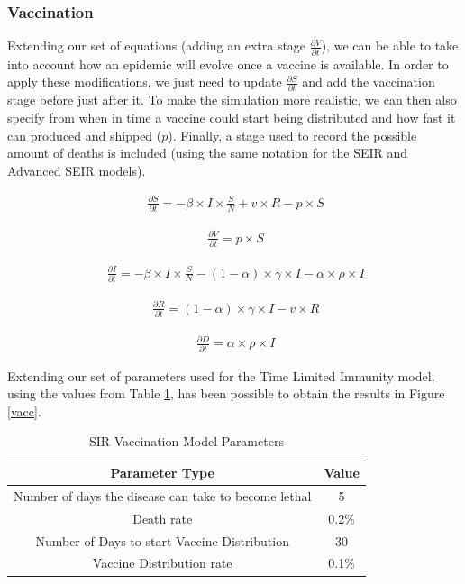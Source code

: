 \subsubsection{Vaccination}

Extending our set of equations (adding an extra stage $\frac{\partial V}{\partial t}$), we can be able to take into account how an epidemic will evolve once a vaccine is available. In order to apply these modifications, we just need to update $\frac{\partial S}{\partial t}$ and add the vaccination stage before just after it. To make the simulation more realistic, we can then also specify from when in time a vaccine could start being distributed and how fast it can produced and shipped ($p$). Finally, a stage used to record the possible amount of deaths is included (using the same notation for the SEIR and Advanced SEIR models).

\useshortskip
\begin{align}
\ \frac{\partial S}{\partial t} = -\beta \times I \times \frac{S}{N} + v \times R - p \times S
\end{align}
\useshortskip

\useshortskip
\begin{align}
\ \frac{\partial V}{\partial t} = p \times S
\end{align}
\useshortskip

\useshortskip
\begin{align}
\ \frac{\partial I}{\partial t} = -\beta \times I \times \frac{S}{N}  -(1-\alpha) \times \gamma \times I -\alpha \times \rho \times I
\end{align}
\useshortskip

\useshortskip
\begin{align}
\ \frac{\partial R}{\partial t} = (1-\alpha) \times \gamma \times I - v \times R
\end{align}
\useshortskip

\useshortskip
\begin{align}
\ \frac{\partial D}{\partial t} = \alpha \times \rho \times I
\end{align}
\useshortskip

Extending our set of parameters used for the Time Limited Immunity model, using the values from Table \ref{table:2}, has been possible to obtain the results in Figure \ref{vacc}.

{
\begin{table}[h!]
\centering
\begin{tabular}{|c|c|}
\hline
Parameter Type & Value \\
\hline
Number of days the disease can take to become lethal & 5  \\
Death rate & 0.2\%  \\
Number of Days to start Vaccine Distribution & 30  \\
Vaccine Distribution rate & 0.1\%  \\
\hline
\end{tabular}
\caption{SIR Vaccination Model Parameters}
\label{table:2}
\end{table}
}

